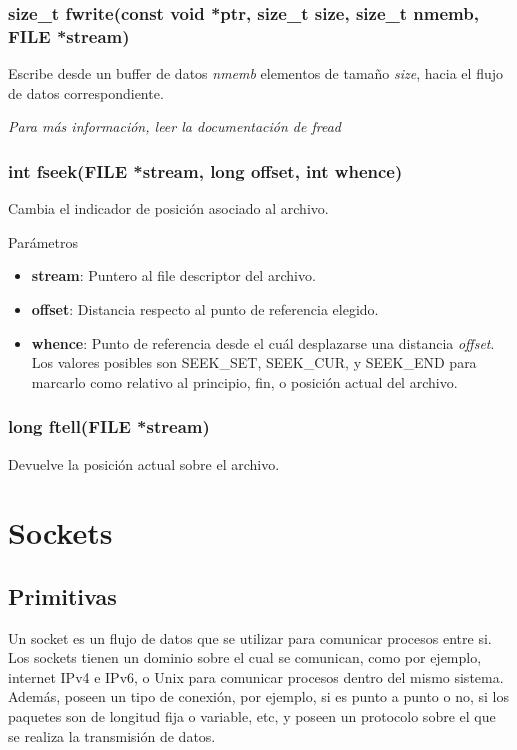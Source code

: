 \documentclass[a4paper, twoside]{article}
\begin{document}
\subsubsection {size\_t fwrite(const void *ptr, size\_t size, size\_t nmemb, FILE *stream)}
Escribe desde un buffer de datos \emph{nmemb} elementos de tamaño \emph{size}, hacia el flujo de datos correspondiente.

\textit{Para más información, leer la documentación de fread}

\subsubsection {int fseek(FILE *stream, long offset, int whence)}
Cambia el indicador de posición asociado al archivo.\\
\begin{parametros*}{Parámetros}
	\begin{itemize}
		\item \textbf{stream}: Puntero al file descriptor del archivo.
		\item \textbf{offset}: Distancia respecto al punto de referencia elegido.
		\item \textbf{whence}: Punto de referencia desde el cuál desplazarse una distancia \emph{offset}. Los valores posibles son SEEK\_SET, SEEK\_CUR, y SEEK\_END para marcarlo como relativo al principio, fin, o posición actual del archivo.
	\end{itemize}
\end{parametros*}

\subsubsection {long ftell(FILE *stream)}
Devuelve la posición actual sobre el archivo.

\newpage
\section{Sockets}
\subsection{Primitivas}
Un socket es un flujo de datos que se utilizar para comunicar procesos entre si. Los sockets tienen un dominio sobre el cual se comunican, como por ejemplo, internet IPv4 e IPv6, o Unix para comunicar procesos dentro del mismo sistema. Además, poseen un tipo de conexión, por ejemplo, si es punto a punto o no, si los paquetes son de longitud fija o variable, etc, y poseen un protocolo sobre el que se realiza la transmisión de datos.
\end{document}
